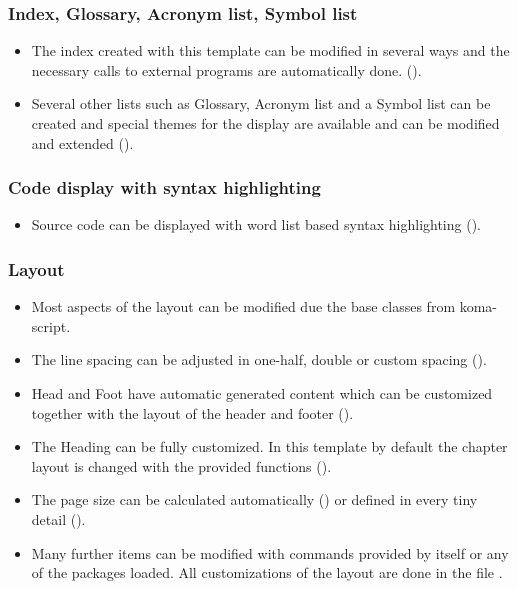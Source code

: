 \subsubsection*{Index, Glossary, Acronym list, Symbol list}
\begin{itemize}
\item The index created with this template can be modified in several ways and the necessary calls to external programs are automatically done. ().   
%
\item Several other lists such as Glossary, Acronym list and a Symbol list can be created and special themes for the display are available and can be modified and extended ().
\end{itemize}

\subsubsection*{Code display with syntax highlighting}
\begin{itemize}
\item Source code can be displayed with word list based syntax highlighting ().
\end{itemize}

\subsubsection*{Layout}
\begin{itemize}
\item Most aspects of the layout can be modified due the base classes from koma-script. 
%
\item The line spacing can be adjusted in one-half, double or custom spacing ().
%
\item Head and Foot have automatic generated content which can be customized together with the layout of the header and footer ().
%
\item The Heading can be fully customized. In this template by default the chapter layout is changed with the provided functions ().
%
\item The page size can be calculated automatically () or defined in every tiny detail ().
%
\item Many further items can be modified with commands provided by \latex itself or any of the packages loaded. All customizations of the layout are done in the file .
\end{itemize}

